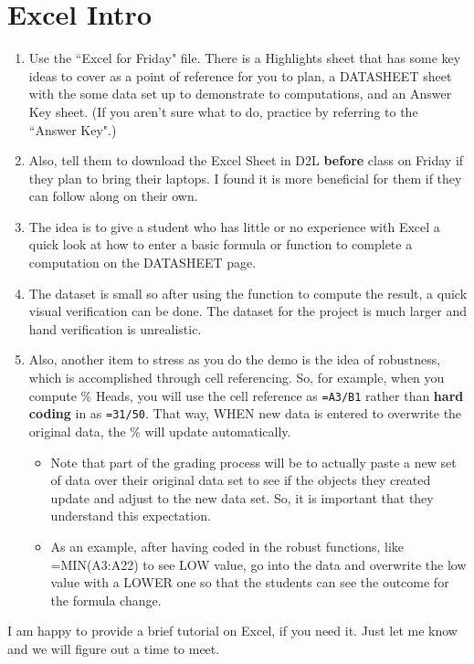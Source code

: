 \documentclass{article}
\begin{document}
\section*{Excel Intro}

    \begin{enumerate}
    
        \item Use the ``Excel for Friday" file.  There is a Highlights sheet that has some key ideas to cover as a point of reference for you to plan, a DATASHEET sheet with the some data set up to demonstrate to computations, and an Answer Key sheet.  (If you aren’t sure what to do, practice by referring to the ``Answer Key".)
        
        \item Also, tell them to download the Excel Sheet in D2L \textbf{before} class on Friday if they plan to bring their laptops. I found it is more beneficial for them if they can follow along on their own.
        
        \item The idea is to give a student who has little or no experience with Excel a quick look at how to enter a basic formula or function to complete a computation on the DATASHEET page.
        
        \item The dataset is small so after using the function to compute the result, a quick visual verification can be done. The dataset for the project is much larger and hand verification is unrealistic.
        
        \item Also, another item to stress as you do the demo is the idea of robustness, which is accomplished through cell referencing. So, for example, when you compute \% Heads, you will use the cell reference as \texttt{=A3/B1} rather than \textbf{hard coding} in as \texttt{=31/50}.  That way, WHEN new data is entered to overwrite the original data, the \% will update automatically.
        
            \begin{itemize}
            
                \item Note that part of the grading process will be to actually paste a new set of data over their original data set to see if the objects they created update and adjust to the new data set. So, it is important that they understand this expectation.
                
                \item As an example, after having coded in the robust functions, like =MIN(A3:A22) to see LOW value, go into the data and overwrite the low value with a LOWER one so that the students can see the outcome for the formula change.
                
            \end{itemize}
            
    \end{enumerate}
    

I am happy to provide a brief tutorial on Excel, if you need it.  Just let me know and we will figure out a time to meet.
\end{document}
